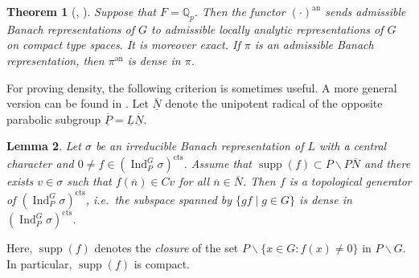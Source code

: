 \documentclass[a4paper]{amsart}
\numberwithin{equation}{section}
\newtheorem{thm}{Theorem}[section]
\newtheorem{lem}[thm]{Lemma}
\theoremstyle{remark}
\theoremstyle{definition}
\DeclareMathOperator{\Ind}{Ind}
\newcommand{\Q}{\mathbb{Q}}
\DeclareMathOperator{\supp}{supp}
\newcommand{\alggrp}[1]{\underline{#1}}
\newcommand{\an}{\mathrm{an}}
\newcommand{\cts}{\mathrm{cts}}
\begin{document}
\begin{thm}[{\cite[Theorem~7.1]{ST}, \cite[Proposition 6.2.4]{locallyanalytic-memoir}}]\label{thm:property of an}
Suppose that $F = \Q_{p}$.
Then the functor $(\cdot)^\an$ sends admissible Banach representations of $G$ to
admissible locally analytic representations of $G$ on compact type spaces.
It is moreover exact.
If $\pi$ is an admissible Banach representation, then $\pi^{\an}$ is dense in $\pi$.
\end{thm}


For proving density, the following criterion is sometimes useful.
A more general version can be found in \cite[\S 2.2]{gl3}.
Let $\overline{\alggrp{N}}$ denote the unipotent radical of the opposite parabolic subgroup $\overline{\alggrp{P}} = \alggrp{L} \overline{\alggrp{N}}$.
\begin{lem}\label{lem:supported on big cell}
Let $\sigma$ be an irreducible Banach representation of $L$ with a central character and $0\ne f\in (\Ind_{P}^{G}\sigma)^{\cts}$.
Assume that $\supp(f)\subset P\backslash P\overline{N}$ and there exists $v\in \sigma$ such that $f(\overline{n})\in Cv$ for all $\overline{n}\in \overline{N}$.
Then $f$ is a topological generator of $(\Ind_{P}^{G}\sigma)^{\cts}$, i.e.\ the subspace spanned by $\{gf\mid g\in G\}$ is dense in $(\Ind_{P}^{G}\sigma)^{\cts}$.
\end{lem}
Here, $\supp(f)$ denotes the \emph{closure} of the set $P\backslash \{x \in G : f(x) \ne 0 \}$ in $P\backslash G$.
In particular, $\supp(f)$ is compact.
\end{document}
